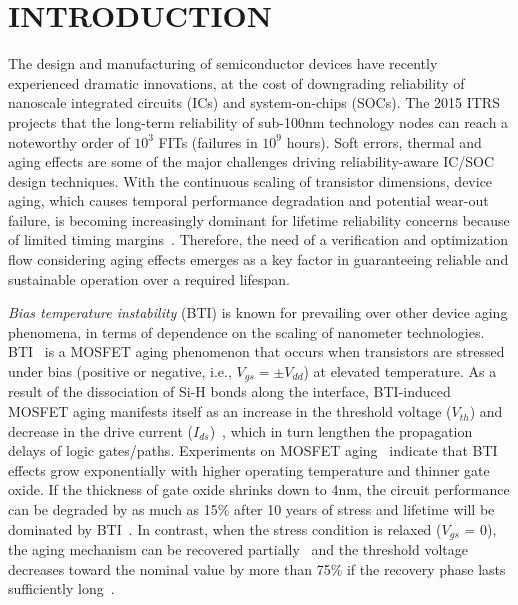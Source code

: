 \section{INTRODUCTION}
The design and manufacturing of semiconductor devices have recently experienced dramatic innovations, at the cost of downgrading reliability of nanoscale integrated circuits (ICs) and system-on-chips (SOCs). The 2015 ITRS~\cite{neisser2015itrs} projects that the long-term reliability of sub-100nm technology nodes can reach a noteworthy order of $10^3$ FITs (failures in $10^9$ hours). Soft errors, thermal and aging effects are some of the major challenges driving reliability-aware IC/SOC design techniques. With the continuous scaling of transistor dimensions, device aging, which causes temporal performance degradation and potential wear-out failure, is becoming increasingly dominant for lifetime reliability concerns because of limited timing margins~\cite{mcpherson2006reliability}. Therefore, the need of a verification and optimization flow considering aging effects emerges as a key factor in guaranteeing reliable and sustainable operation over a required lifespan.

\textit{Bias temperature instability} (BTI) is known for prevailing over other device aging phenomena, in terms of dependence on the scaling of nanometer technologies. BTI~\cite{schroder2003negative} is a MOSFET aging phenomenon that occurs when transistors are stressed under bias (positive or negative, i.e., $V_{gs} = \pm V_{dd}$) at elevated temperature. As a result of the dissociation of Si-H bonds along the  interface, BTI-induced MOSFET aging manifests itself as an increase in the threshold voltage ($V_{th}$) and decrease in the drive current ($I_{ds}$)~\cite{stathis2006negative}, which in turn lengthen the propagation delays of logic gates/paths. Experiments on MOSFET aging~\cite{chakravarthi2004comprehensive} indicate that BTI effects grow exponentially with higher operating temperature and thinner gate oxide. If the thickness of gate oxide shrinks down to 4nm, the circuit performance can be degraded by as much as 15\% after 10 years of stress and lifetime will be dominated by BTI~\cite{kimizuka1999impact}. In contrast, when the stress condition is relaxed ($V_{gs}$ = 0), the aging mechanism can be recovered partially~\cite{kumar2006analytical} and the threshold voltage decreases toward the nominal value by more than 75\% if the recovery phase lasts sufficiently long~\cite{wang2010impact}.

